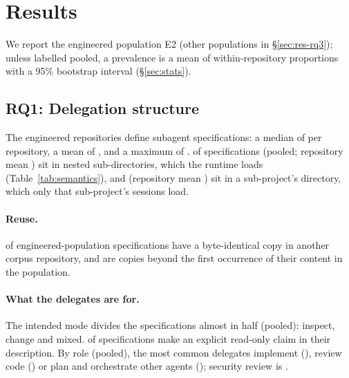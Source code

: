 
\section{Results}
\label{sec:results}

We report the engineered population E2 (other populations in \S\ref{sec:res-rq3}); unless labelled pooled, a
prevalence is a mean of within-repository proportions with a 95\% bootstrap interval (\S\ref{sec:stats}).

\subsection{RQ1: Delegation structure}
\label{sec:res-rq1}

The \nReposEng{} engineered repositories define \nSpecsEng{} subagent specifications: a median of \medianTeam{} per
repository, a mean of \meanTeam{}, and a maximum of \maxTeam{}. \RQoneNestedPooled{} of specifications (pooled;
repository mean \RQoneNested{}) sit in nested sub-directories, which the runtime loads (Table~\ref{tab:semantics}), and
\RQoneOutsideRootPooled{} (repository mean \RQoneOutsideRoot{}) sit in a sub-project's  directory, which
only that sub-project's sessions load.

\paragraph{Reuse.}
\RQoneDuplication{} of engineered-population specifications have a byte-identical copy in another corpus repository, and
\RQoneRepeatShare{} are copies beyond the first occurrence of their content in the population.

\paragraph{What the delegates are for.}
The intended mode divides the specifications almost in half (pooled): \RQtwoShareInspect{} inspect,
\RQtwoShareChange{} change and \RQtwoShareMixed{} mixed. \RQtwoReadonlyClaim{} of specifications make an explicit
read-only claim in their description. By role (pooled), the most common delegates implement (\RoleShareImpl{}),
review code (\RoleShareReview{}) or plan and orchestrate other agents (\RoleSharePlan{}); security review is
\RoleShareSec{}.

